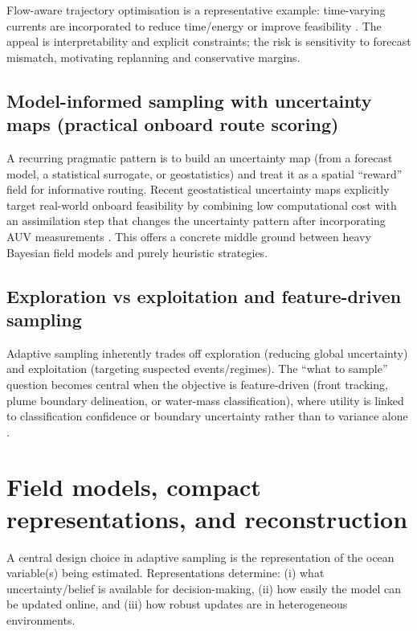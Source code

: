 Flow-aware trajectory optimisation is a representative example: time-varying currents are incorporated to reduce time/energy or improve feasibility
\parencite{aguiar2018trajectoryopt}. The appeal is interpretability and explicit constraints; the risk is sensitivity to forecast mismatch, motivating replanning and conservative margins.

\subsection{Model-informed sampling with uncertainty maps (practical onboard route scoring)}
A recurring pragmatic pattern is to build an uncertainty map (from a forecast model, a statistical surrogate, or geostatistics) and treat it as a spatial ``reward'' field
for informative routing. Recent geostatistical uncertainty maps explicitly target real-world onboard feasibility by combining low computational cost with an assimilation step
that changes the uncertainty pattern after incorporating AUV measurements \parencite{duarte2025geostatistical}. This offers a concrete middle ground between
heavy Bayesian field models and purely heuristic strategies.

\subsection{Exploration vs exploitation and feature-driven sampling}
Adaptive sampling inherently trades off exploration (reducing global uncertainty) and exploitation (targeting suspected events/regimes).
The ``what to sample'' question becomes central when the objective is feature-driven (front tracking, plume boundary delineation, or water-mass classification),
where utility is linked to classification confidence or boundary uncertainty rather than to variance alone
\parencite{hwang2019auvreview,ge2023watermasses,das2012coordinated}.

\section{Field models, compact representations, and reconstruction} \label{sec:compact_models}

A central design choice in adaptive sampling is the representation of the ocean variable(s) being estimated.
Representations determine: (i) what uncertainty/belief is available for decision-making, (ii) how easily the model can be updated online, and
(iii) how robust updates are in heterogeneous environments.

